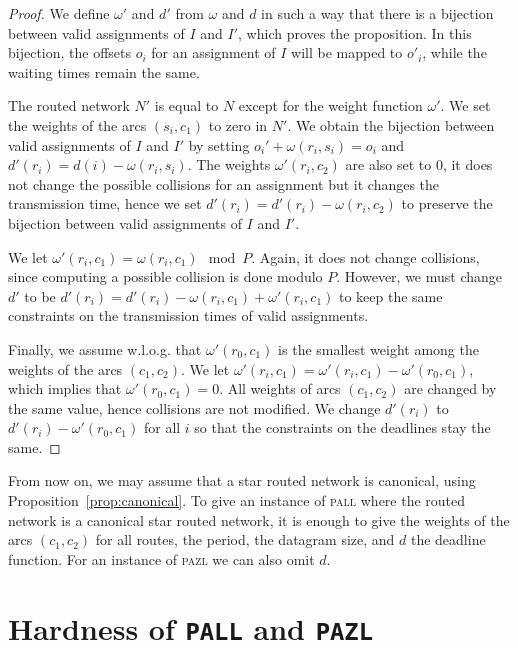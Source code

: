 \documentclass[a4paper,10pt]{journal}
\newcommand\pazl{\textsc{pazl}\xspace}
\newcommand\pall{\textsc{pall}\xspace}
\begin{document}
  \begin{proof}
  We define $\omega'$ and $d'$ from $\omega$ and $d$ in such a way that there is a bijection 
  between valid assignments of $I$ and $I'$, which proves the proposition. In this bijection,
  the offsets $o_i$ for an assignment of $I$ will be mapped to $o'_i$, while the waiting times remain the same.
  
  The routed network $N'$ is equal to $N$ except for the weight function $\omega'$.
  We set the weights of the arcs $(s_i,c_1)$ to zero in $N'$. We obtain the bijection between valid assignments of $I$ and $I'$ by setting $o_i' + \omega(r_i,s_i) = o_i $ and $d'(r_i) = d(i) - \omega(r_i,s_i)$. The weights $\omega'(r_i,c_2)$ are also set to $0$, it does not change the possible collisions
  for an assignment but it changes the transmission time, hence we set $d'(r_i) = d'(r_i) - \omega(r_i,c_2)$
  to preserve the bijection between valid assignments of $I$ and $I'$. 

  We let $\omega'(r_i,c_1) = \omega(r_i,c_1) \mod P$. Again, it does not change collisions, since computing a possible collision is done modulo $P$. However, we must change $d'$ to be $d'(r_i) = d'(r_i) - \omega(r_i,c_1) + \omega'(r_i,c_1)$ to keep the same constraints on the transmission times of valid assignments.

  Finally, we assume w.l.o.g. that $\omega'(r_0,c_1)$ is the smallest weight among the weights of the arcs
  $(c_1,c_2)$. We let $\omega'(r_i,c_1) = \omega'(r_i,c_1) - \omega'(r_0,c_1)$, which implies that $\omega'(r_0,c_1) = 0$.  All weights of arcs $(c_1,c_2)$ are changed by the same value, hence collisions are not modified. We change $d'(r_i)$ to  $d'(r_i) - \omega'(r_0,c_1)$ for all $i$ so that the constraints on the deadlines stay the same.
  \end{proof}

   From now on, we may assume that a star routed network is canonical, using Proposition~\ref{prop:canonical}. To give an instance of \pall where the routed network is a canonical star routed network, it is enough to give the weights of the arcs $(c_1,c_2)$ for all routes, the period, the datagram size, and $d$ the deadline function. For an instance of \pazl we can also omit $d$.


\section{Hardness of \texttt{PALL} and \texttt{PAZL}}
  \label{sec:complexity}
\end{document}
